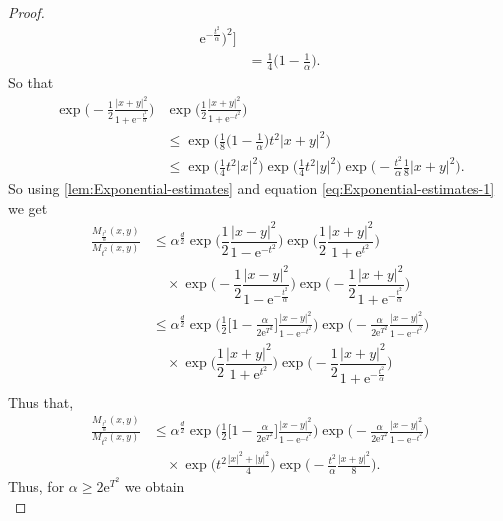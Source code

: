 \documentclass[a4paper,oneside,10pt]{amsproc}
\theoremstyle{plain}
\theoremstyle{remark}
\theoremstyle{definition}
\renewcommand{\leq}{\leqslant}
\renewcommand{\leq}{\leqslant}
\renewcommand{\geq}{\geqslant}
\newcommand{\e}{\mathrm{e}} %
\renewcommand{\leq}{\leqslant} %
\renewcommand{\geq}{\geqslant} %
\begin{document}
\begin{proof}
\begin{align*}
{      \e^{-\frac{t^2}{\alpha}})^2} \biggr]\\
    &= \frac{1}{4} \biggl(1 - \frac1\alpha \biggr).
  \end{align*}
  So that
  \begin{align*}
    \exp \biggl (-\frac12 \frac{|x + y|^2}{1 + \e^{-\frac{t^2}{\alpha}}}
    \biggr ) &\exp \biggl (\frac12 \frac{|x + y|^2}{1 + \e^{-t^2}}
    \biggr )\\
    &\leq \exp \biggl (\frac18 \biggl(1 - \frac1\alpha \biggr) t^2 |x +
    y|^2 \biggr)\\
    &\leq \exp \biggl (\frac14 t^2 |x|^2 \biggr) \exp \biggl (\frac14
    t^2 |y|^2 \biggr)  \exp \biggl (-\frac{t^2}\alpha \frac18 |x + y|^2 \biggr).
  \end{align*}
  So using \autoref{lem:Exponential-estimates} and equation
  \eqref{eq:Exponential-estimates-1} we get
  \begin{align*}
    \frac{M_{\frac{t^2}{\alpha}}(x, y)}{M_{t^2}(x, y)} &\leq \alpha^{\frac{d}2}  \exp\biggl(\dfrac12 \dfrac{|x - y|^2}{1
      - \e^{-t^2}}  \biggr) \exp\biggl(\dfrac12 \dfrac{|x + y|^2}{1
      + \e^{t^2}} \biggr)\\
    &\quad \times \exp\biggl(-\dfrac12 \dfrac{|x - y|^2}{1
      - \e^{-\frac{t^2}{\alpha}}}  \biggr) \exp\biggl(-\dfrac12
    \dfrac{|x + y|^2}{1 + \e^{-\frac{t^2}{\alpha}}} \biggr)\\
    &\leq \alpha^{\frac{d}2} \exp \biggl (\frac12 \biggl[1 -\frac{\alpha}{2\e^{T^2}} \biggr] \frac{|x - y|^2}{1 - \e^{-t^2}}
    \biggr ) \exp \biggl (-\frac{\alpha}{2\e^{T^2}} \frac{|x - y|^2}{1 - \e^{-t^2}}
    \biggr )\\
    &\quad \times  \exp\biggl(\dfrac12 \dfrac{|x + y|^2}{1 + \e^{t^2}}
    \biggr) \exp\biggl(-\dfrac12 \dfrac{|x + y|^2}{1 + \e^{-\frac{t^2}{\alpha}}} \biggr)\\
  \end{align*}
  Thus that,
  \begin{align*}
    \frac{M_{\frac{t^2}{\alpha}}(x, y)}{M_{t^2}(x, y)} &\leq \alpha^{\frac{d}2}
    \exp \biggl (\frac12 \biggl[1
    -\frac{\alpha}{2\e^{T^2}} \biggr] \frac{|x - y|^2}{1 - \e^{-t^2}}
    \biggr ) \exp \biggl (-\frac{\alpha}{2\e^{T^2}} \frac{|x - y|^2}{1 - \e^{-t^2}}
    \biggr )\\
    &\quad \times \exp \biggl (t^2 \frac{|x|^2 + |y|^2}4 \biggr)
    \exp\biggl(-\frac{t^2}\alpha \frac{|x + y|^2}8 \biggr).
  \end{align*}
  Thus, for $\alpha \geq 2 \e^{T^2}$ we obtain
  \begin{equation*}

\end{equation*}
\end{proof}
\end{document}
